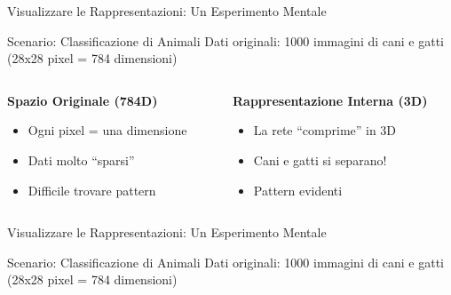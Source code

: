 \documentclass[aspectratio=169]{beamer}
\begin{document}
%
%
\begin{frame}{Visualizzare le Rappresentazioni: Un Esperimento Mentale}

\begin{block}{Scenario: Classificazione di Animali}
Dati originali: 1000 immagini di cani e gatti (28x28 pixel = 784 dimensioni)
\end{block}
\vspace{1cm}
\begin{columns}
\begin{column}{0.5\textwidth}
\textbf{Spazio Originale (784D)}
\begin{itemize}
\item Ogni pixel = una dimensione
\item Dati molto ``sparsi''
\item Difficile trovare pattern
\end{itemize}
\end{column}
\begin{column}{0.5\textwidth}
\textbf{Rappresentazione Interna (3D)}
\begin{itemize}
\item La rete ``comprime'' in 3D
\item Cani e gatti si separano!
\item Pattern evidenti
\end{itemize}
\end{column}
\end{columns}
\end{frame}
%
%
\begin{frame}{Visualizzare le Rappresentazioni: Un Esperimento Mentale}

\begin{block}{Scenario: Classificazione di Animali}
Dati originali: 1000 immagini di cani e gatti (28x28 pixel = 784 dimensioni)
\end{block}

\vspace{0.5cm}

\begin{center}
\end{center}

\end{frame}
\end{document}
